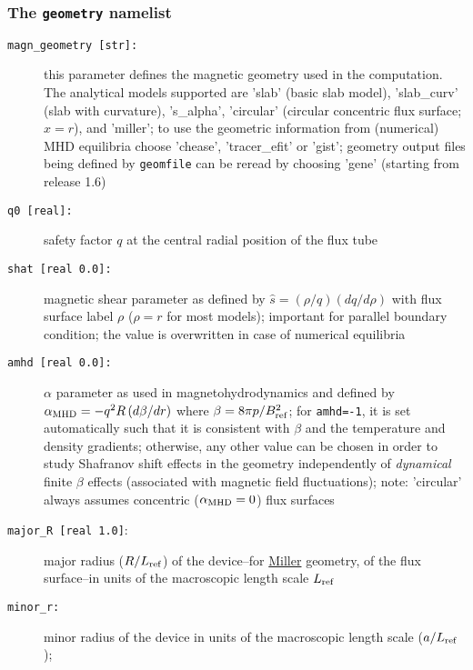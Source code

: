 \documentclass[12pt]{article}
\begin{document}
\subsubsection{The \texttt{geometry} namelist}
\hypertarget{geometry_nml}{}
\begin{description}
\item[\hypertarget{magn_geometry}{\tt magn\_geometry [str]:}] this parameter defines the magnetic geometry used in the computation.
  The analytical models supported are 'slab' (basic slab model), 'slab\_curv' (slab with curvature),
  's\_alpha', 'circular' (circular concentric flux surface; $x = r$), and 'miller';
  to use the geometric information from
  (numerical) MHD equilibria choose 'chease', 'tracer\_efit' or 'gist';
  \gene geometry output files being defined by \texttt{geomfile} can be reread
  by choosing 'gene' (starting from release 1.6)
%
%
\item[{\parbox[t]{0.9\linewidth}{additional parameters for analytical equilibrium models\\
 's\_alpha', 'circular', and 'miller':}}]
\item[\hypertarget{q0}{\texttt{q0 [real]:}}] safety factor $q$ at the central radial position of the flux tube
\item[\texttt{shat [real 0.0]:}] magnetic shear parameter as defined by $\hat s=(\rho/q)(dq/d\rho)$ with flux surface label $\rho$
 ($\rho = r$ for most models); important for parallel boundary condition; the value is overwritten in case of numerical equilibria
\item[\texttt{amhd [real 0.0]:}] $\alpha$ parameter as used in magnetohydrodynamics and defined by
  $\alpha_{\rm MHD}=-q^2R\,(d\beta/dr)$ where $\beta=8\pi p/B_{\rm ref}^2$; for \texttt{amhd=-1}, it is set automatically
  such that it is consistent with $\beta$ and the temperature and density gradients; otherwise, any
  other value can be chosen in order to study Shafranov shift effects in the geometry independently of
  {\em dynamical} finite $\beta$ effects (associated with magnetic field fluctuations); note: 'circular' always assumes
  concentric ($\alpha_{\rm MHD} = 0$) flux surfaces
\item[\hypertarget{major_R}{\texttt{major\_R [real 1.0]}}:] major radius ($R/L_{\rm ref}$) of the device--for \hyperlink{desc:miller}{Miller} geometry,
of the flux surface--in units of the macroscopic length scale $L_{\rm ref}$
\item[\hypertarget{minor_r}{\texttt{minor\_r:}}] minor radius of the device in units of the macroscopic length scale ($a/L_{\rm ref}$);

\end{description}
\end{document}
